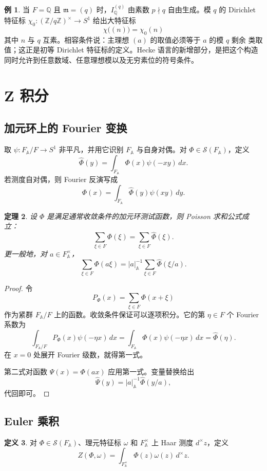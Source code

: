 \documentclass[11pt,a4paper,openany]{ctexbook}
\numberwithin{equation}{chapter}
\newcommand{\Q}{\mathbb{Q}}
\newcommand{\Z}{\mathbb{Z}}
\newcommand{\A}{\mathbb{A}}
\theoremstyle{plain}
\newtheorem{theorem}{定理}[chapter]
\theoremstyle{definition}
\newtheorem{definition}[theorem]{定义}
\newtheorem{example}[theorem]{例}
\theoremstyle{remark}
\begin{document}
\begin{example}
当 $F=\Q$ 且 $\mathfrak m=(q)$ 时，$I_\Q^{(q)}$ 由素数 $p\nmid q$ 自由生成。模
$q$ 的 Dirichlet 特征标 $\chi_0:(\Z/q\Z)^\times\to S^1$ 给出大特征标
\[
  \chi\bigl((n)\bigr)=\chi_0(n)
\]
其中 $n$ 与 $q$ 互素。相容条件说：主理想 $(a)$ 的取值必须等于 $a$ 的模 $q$ 剩余
类取值；这正是初等 Dirichlet 特征标的定义。Hecke 语言的新增部分，是把这个构造
同时允许到任意数域、任意理想模以及无穷素位的符号条件。
\end{example}

\section{Z 积分}

\subsection{加元环上的 Fourier 变换}

取 $\psi:F_{\A}/F\to S^1$ 非平凡，并用它识别 $F_{\A}$ 与自身对偶。对 $\Phi\in\mathcal S(F_{\A})$，定义
\[
  \widehat\Phi(y)=\int_{F_{\A}}\Phi(x)\psi(-xy)\,dx .
\]
若测度自对偶，则 Fourier 反演写成
\[
  \Phi(x)=\int_{F_{\A}}\widehat\Phi(y)\psi(xy)\,dy .
\]

\begin{theorem}
设 $\Phi$ 是满足通常收敛条件的加元环测试函数，则 Poisson 求和公式成立：
\[
  \sum_{\xi\in F}\Phi(\xi)=\sum_{\xi\in F}\widehat\Phi(\xi).
\]
更一般地，对 $a\in F_{\A}^{\times}$，
\[
  \sum_{\xi\in F}\Phi(a\xi)
  =
  |a|_{\A}^{-1}
  \sum_{\xi\in F}\widehat\Phi(\xi/a).
\]
\end{theorem}

\begin{proof}
令
\[
  P_\Phi(x)=\sum_{\xi\in F}\Phi(x+\xi)
\]
作为紧群 $F_{\A}/F$ 上的函数。收敛条件保证可以逐项积分。它的第 $\eta\in F$ 个 Fourier 系数为
\[
  \int_{F_{\A}/F}P_\Phi(x)\psi(-\eta x)\,dx
  =
  \int_{F_{\A}}\Phi(x)\psi(-\eta x)\,dx
  =
  \widehat\Phi(\eta).
\]
在 $x=0$ 处展开 Fourier 级数，就得第一式。

第二式对函数 $\Psi(x)=\Phi(ax)$ 应用第一式。变量替换给出
\[
  \widehat\Psi(y)=|a|_{\A}^{-1}\widehat\Phi(y/a),
\]
代回即可。
\end{proof}

\subsection{Euler 乘积}

\begin{definition}
对 $\Phi\in\mathcal S(F_{\A})$、理元特征标 $\omega$ 和 $F_{\A}^{\times}$ 上 Haar 测度 $d^\times z$，定义
\[
  Z(\Phi,\omega)=\int_{F_{\A}^{\times}}\Phi(z)\omega(z)\,d^\times z.
\]
\end{definition}
\end{document}

